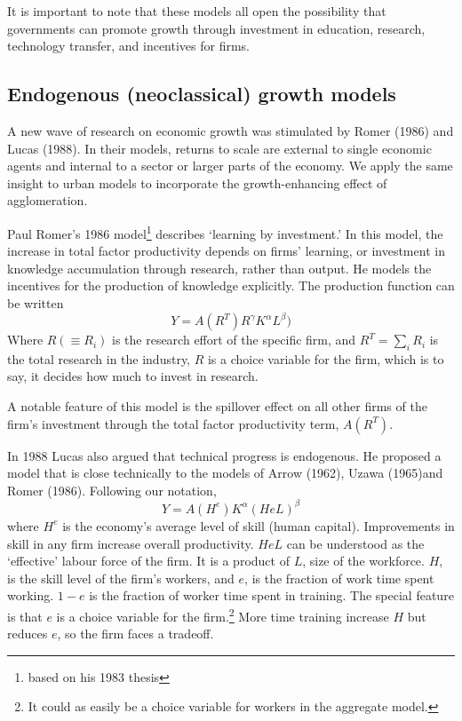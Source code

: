 It is important to note that these models all open the possibility that governments can  promote growth through investment in education, research, technology transfer, and incentives for firms.

\subsection{Endogenous (neoclassical) growth models}
A new wave of research on economic growth was stimulated by Romer (1986) and Lucas (1988). In their models, returns to scale are external to single economic agents and internal to a sector or larger parts of the economy. We apply the same insight to urban models to incorporate the growth-enhancing effect of agglomeration. 


Paul Romer's 1986  model\footnote{ based on his 1983 thesis} describes `learning by investment.' In this model, the increase in {total factor productivity} depends on firms' learning, or investment in knowledge accumulation through research, rather than output. He models the incentives for the production of knowledge explicitly. The production function  can be written
\[Y = A(R^T)R^\gamma  K^\alpha L^\beta) \]
Where $R(\equiv R_i)$ is the research effort of the specific firm, and $R^T=\sum_iR_i$ is the total research in the industry,  $R$ is a choice variable for the firm, which is to say, it decides how much to invest in research. 

A notable feature of this model is the spillover effect on all other firms of the firm's investment through the \gls{total factor productivity} term,  $A(R^T)$. %

In 1988 Lucas also argued that technical progress is endogenous. He proposed a model that is  close technically to the models of Arrow (1962), Uzawa (1965)and Romer (1986). Following our notation, 
\[ Y = A(H^e) K^\alpha (HeL)^\beta \] 
where $H^e$ is the economy's average level of skill (human capital).  Improvements in skill in any firm  increase overall productivity.  $HeL$  can be understood as the `effective' labour force of the firm. It is a product of $L$, size of the workforce. $H$, is the skill level of the firm's workers, and $e$, is the fraction of work time spent working. $1-e$ is the fraction of worker time  spent in training. The  special feature is that $e$ is a choice variable for the firm.\footnote{It could as easily be a choice variable for workers in the aggregate model.} More time training increase $H$ but reduces $e$, so the firm faces a tradeoff.

